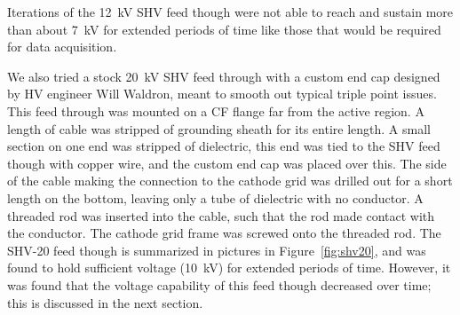 Iterations of the 12~kV SHV feed though were not able to reach and sustain more than about 7~kV for extended periods of time like those that would be required for data acquisition.

We also tried a stock 20~kV SHV feed through with a custom end cap designed by \ac{HV} engineer Will Waldron, meant to smooth out typical triple point issues. This feed through was mounted on a CF flange far from the active region. A length of cable was stripped of grounding sheath for its entire length. A small section on one end was stripped of dielectric, this end was tied to the SHV feed though with copper wire, and the custom end cap was placed over this. The side of the cable making the connection to the cathode grid was drilled out for a short length on the bottom, leaving only a tube of dielectric with no conductor. A threaded rod was inserted into the cable, such that the rod made contact with the conductor. The cathode grid frame was screwed onto the threaded rod. The SHV-20 feed though is summarized in pictures in Figure~\ref{fig:shv20}, and was found to hold sufficient voltage (10~kV) for extended periods of time. However, it was found that the voltage capability of this feed though decreased over time; this is discussed in the next section.

